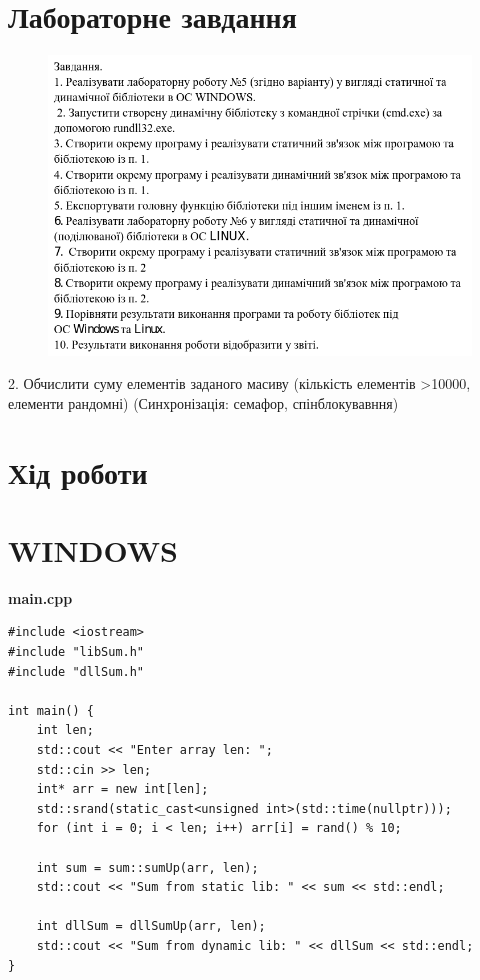 \documentclass{article}
\begin{document}
\begin{normalsize}
	\section*{Лабораторне завдання}
	
	\begin{figure}[H]
		\centering
		\includegraphics[scale=0.7]{v}
	\end{figure}
	\begin{center}
		2. Обчислити суму елементів заданого масиву (кількість елементів >10000,
		елементи рандомні) (Синхронізація: семафор, спінблокувавння)
	\end{center}

	\section*{Хід роботи}	
	\section*{WINDOWS}
	\textbf{main.cpp}
	\begin{lstlisting}
#include <iostream>
#include "libSum.h"
#include "dllSum.h"

int main() {
	int len;
	std::cout << "Enter array len: ";
	std::cin >> len;
	int* arr = new int[len];
	std::srand(static_cast<unsigned int>(std::time(nullptr)));
	for (int i = 0; i < len; i++) arr[i] = rand() % 10;
	
	int sum = sum::sumUp(arr, len);
	std::cout << "Sum from static lib: " << sum << std::endl;
	
	int dllSum = dllSumUp(arr, len);
	std::cout << "Sum from dynamic lib: " << dllSum << std::endl;
}
	\end{lstlisting}
	

\end{normalsize}
\end{document}
